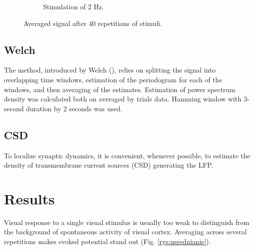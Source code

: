 \documentclass{pracalicmgr}
\begin{document}
\begin{figure}[H]
\begin{subfigure}{.5\textwidth}
	\caption{Stimulation of 2 Hz.}
	\label{rys:piki_2Hz}
	\end{subfigure}
	\caption{Averaged signal after 40 repetitions of stimuli.}
	\label{rys:piki}
	\end{figure}

    \section{Welch}
    The method, introduced by Welch (\cite{welch}),  relies  on splitting the signal into overlapping time windows, estimation of the periodogram for each of the windows, and then averaging of the estimates. Estimation of power spectrum density was calculated both on averaged by trials data. Hamming window with 3-second duration by 2 seconds was used. 
    
    \section{CSD}
    To localize synaptic dynamics, it is convenient, whenever possible, to estimate the density of transmembrane current sources (CSD) generating the LFP.
    
    \chapter{Results}
    Visual response to a single visual stimulus is usually too weak to distinguish from the background of spontaneous activity of visual cortex. Averaging across several repetitions makes evoked potential stand out (Fig. \ref{rys:usrednianie}).
    
\end{document}

